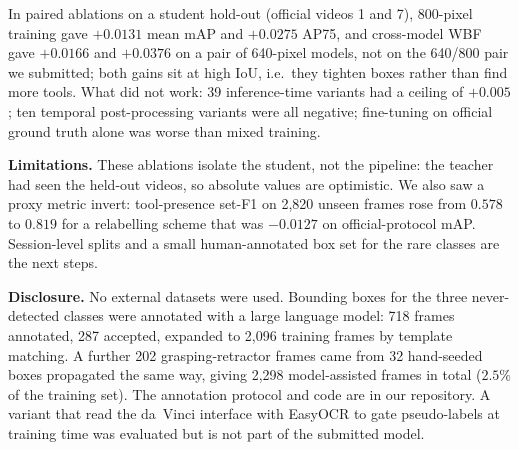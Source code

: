 In paired ablations on a student hold-out (official videos 1 and 7), 800-pixel
training gave $+0.0131$ mean mAP and $+0.0275$ AP75, and cross-model WBF gave $+0.0166$ and
$+0.0376$ on a pair of 640-pixel models, not on the 640/800 pair we submitted; both gains sit at high IoU, i.e.\ they tighten boxes rather than find more tools. What did not work: 39 inference-time variants had a ceiling of $+0.005$; ten
temporal post-processing variants were all negative; fine-tuning on official ground truth alone was worse
than mixed training.

\medskip
\noindent\textbf{Limitations.} These ablations isolate the student, not the pipeline: the
teacher had seen the held-out videos, so absolute values are optimistic. We also saw a proxy metric invert: tool-presence set-F1 on 2,820
unseen frames rose from $0.578$ to $0.819$ for a relabelling scheme that was $-0.0127$ on
official-protocol mAP. Session-level splits and a
small human-annotated box set for the rare classes are the next steps.

\medskip
\noindent\textbf{Disclosure.} No external datasets were used. Bounding boxes for the three
never-detected classes were annotated with a large language model: 718
frames annotated, 287 accepted, expanded to 2,096 training frames by template matching.
A further 202 grasping-retractor frames came from 32 hand-seeded boxes propagated the same
way, giving 2,298 model-assisted frames in total ($2.5\%$ of the training set). The
annotation protocol and code are in our repository. A variant that read the da~Vinci
interface with EasyOCR to gate pseudo-labels at training time was evaluated but is not part
of the submitted model.
